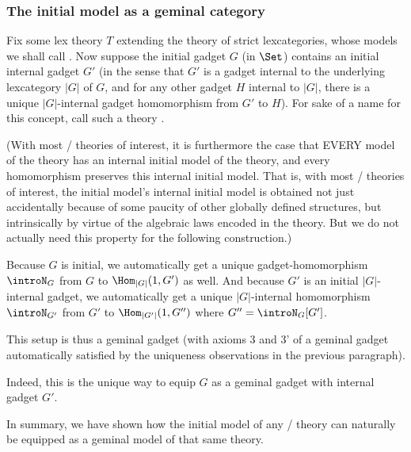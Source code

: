 \subsubsection{The initial model as a geminal category}
\begin{construction}\label{InitoGeminalYieldsGeminal}
Fix some lex theory $T$ extending the theory of strict lexcategories, whose models we shall call . Now suppose the initial gadget $G$ (in $\Set$) contains an initial internal gadget $G'$ (in the sense that $G'$ is a gadget internal to the underlying lexcategory $|G|$ of $G$, and for any other gadget $H$ internal to $|G|$, there is a unique $|G|$-internal gadget homomorphism from $G'$ to $H$). For sake of a name for this concept, call such a theory .


(With most \initogeminal/ theories of interest, it is furthermore the case that EVERY model of the theory has an internal initial model of the theory, and every homomorphism preserves this internal initial model. That is, with most \initogeminal/ theories of interest, the initial model's internal initial model is obtained not just accidentally because of some paucity of other globally defined structures, but intrinsically by virtue of the algebraic laws encoded in the theory. But we do not actually need this property for the following construction.)

Because $G$ is initial, we automatically get a unique gadget-homomorphism $\introN_{G}$ from $G$ to $\Hom_{|G|}(1, G')$ as well. And because $G'$ is an initial $|G|$-internal gadget, we automatically get a unique $|G|$-internal homomorphism $\introN_{G'}$ from $G'$ to $\Hom_{|G'|}(1, G'')$ where $G'' = \introN_{G}[G']$.

This setup is thus a geminal gadget (with axioms 3 and 3' of a geminal gadget automatically satisfied by the uniqueness observations in the previous paragraph).

Indeed, this is the unique way to equip $G$ as a geminal gadget with internal gadget $G'$.

In summary, we have shown how the initial model of any \initogeminal/ theory can naturally be equipped as a geminal model of that same theory.
\end{construction}

